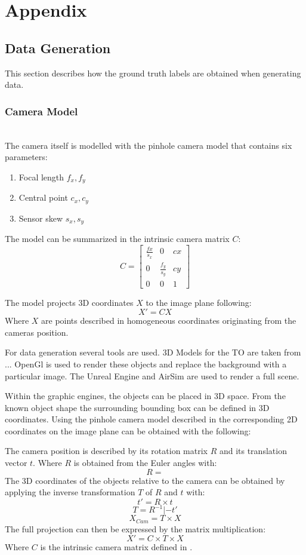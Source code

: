 \chapter{Appendix}
\section{Data Generation}
\label{sec:appendix:datagen}

This section describes how the ground truth labels are obtained when generating data.

\subsection{Camera Model}

\hfill \\
The camera itself is modelled with the pinhole camera model that contains six parameters:

\begin{enumerate}
	\item Focal length $f_x,f_y$
	\item Central point $c_x,c_y$
	\item Sensor skew $s_x, s_y$
\end{enumerate}

The model can be summarized in the intrinsic camera matrix $C$:
\begin{equation}
C = \begin{bmatrix}
\frac{fx}{s_x} & 0 &cx \\
0&  \frac{f_y}{s_y}&cy \\
0& 	0&	1
\end{bmatrix}
\label{eq:pinhole1}
\end{equation}

The model projects 3D coordinates $X$ to the image plane following:
\begin{equation}
X' = C X
\label{eq:pinhole2}
\end{equation}
Where $X$ are points described in homogeneous coordinates originating from the cameras position.

For data generation several tools are used. 3D Models for the \ac{TO} are taken from ... OpenGl is used to render these objects and replace the background with a particular image. The Unreal Engine and AirSim are used to render a full scene.

Within the graphic engines, the objects can be placed in 3D space. From the known object shape the surrounding bounding box can be defined in 3D coordinates. Using the pinhole camera model described in  the corresponding 2D coordinates on the image plane can be obtained with the following:

The camera position is described by its rotation matrix $R$ and its translation vector $t$. Where $R$ is obtained from the Euler angles with:
$$
R =
$$
The 3D coordinates of the objects relative to the camera can be obtained by applying the inverse transformation $T$ of $R$ and $t$ with:
$$
t' = R \times t
$$
$$
T = R^{-1}|-t'
$$
$$
X_{Cam} = T\times X
$$
The full projection can then be expressed by the matrix multiplication:
$$
X' = C\times T\times X
$$
Where $C$ is the intrinsic camera matrix defined in .